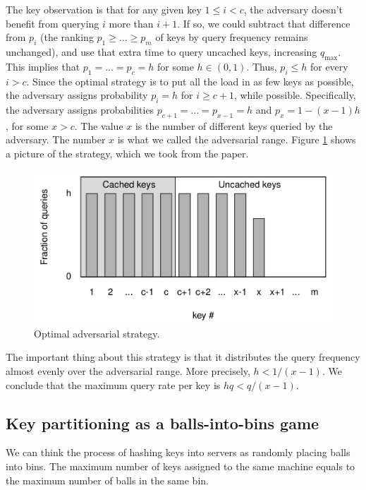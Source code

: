 \documentclass[10pt,letterpaper]{article}
\begin{document}
The key observation is that for any given key $1 \leq i < c$, the adversary doesn't benefit from querying $i$ more than $i + 1$. If so, we could subtract that difference from $p_i$ (the ranking $p_1 \geq \dots \geq p_m$ of keys by query frequency remains unchanged), and use that extra time to query uncached keys, increasing $q_{\max}$. This implies that $p_1 = \dots = p_c = h$ for some $h \in (0, 1)$. Thus, $p_i \leq h$ for every $i > c$. Since the optimal strategy is to put all the load in as few keys as possible, the adversary assigns probability $p_i = h$ for $i \geq c + 1$, while possible. Specifically, the adversary assigns probabilities $p_{c + 1} = \dots = p_{x - 1} = h$ and $p_x = 1 - (x - 1)h$, for some $x > c$. The value $x$ is the number of different keys queried by the adversary. The number $x$ is what we called the adversarial range. Figure \ref{fig:adversary} shows a picture of the strategy, which we took from the paper.

\begin{figure}
	\centering
	\includegraphics[scale=0.25]{img/adversary.png}
	\caption{Optimal adversarial strategy.}
	\label{fig:adversary}
\end{figure}

The important thing about this strategy is that it distributes the query frequency almost evenly over the adversarial range. More precisely, $h < 1 / (x - 1)$. We conclude that the maximum query rate per key is $hq < q / (x - 1)$.

\subsection{Key partitioning as a balls-into-bins game}

We can think the process of hashing keys into servers as randomly placing balls into bins. The maximum number of keys assigned to the same machine equals to the maximum number of balls in the same bin.
\end{document}

